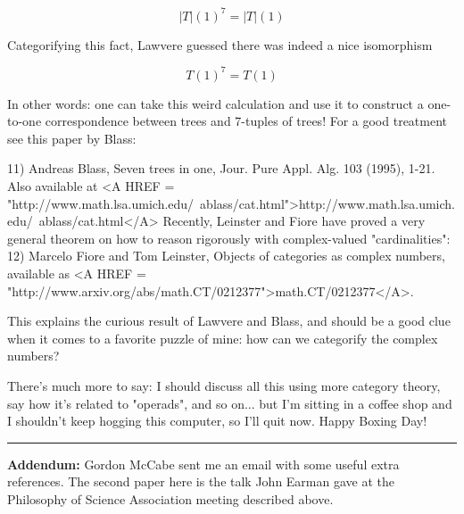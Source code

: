 $$

|T|(1)^{7} = |T|(1)
$$
    

Categorifying this fact, Lawvere guessed there was indeed a nice
isomorphism 


$$

T(1)^{7} = T(1)
$$
    

In other words: one can take this weird calculation and use it
to construct a one-to-one correspondence between trees and 
7-tuples of trees!  For a good treatment see this paper by Blass:

11) Andreas Blass, Seven trees in one, Jour. Pure Appl. Alg. 103 (1995), 
1-21.  Also available at <A HREF = "http://www.math.lsa.umich.edu/~ablass/cat.html">http://www.math.lsa.umich.edu/~ablass/cat.html</A>
Recently, Leinster and Fiore have proved a very general theorem 
on how to reason rigorously with complex-valued "cardinalities":
12) Marcelo Fiore and Tom Leinster, Objects of categories as
complex numbers, available as <A HREF = "http://www.arxiv.org/abs/math.CT/0212377">math.CT/0212377</A>.

This explains the curious result of Lawvere and Blass, and
should be a good clue when it comes to a favorite puzzle of
mine: how can we categorify the complex numbers?

There's much more to say: I should discuss all this using more 
category theory, say how it's related to "operads", and so on...
but I'm sitting in a coffee shop and I shouldn't keep hogging
this computer, so I'll quit now.   Happy Boxing Day!

\par\noindent\rule{\textwidth}{0.4pt}
\textbf{Addendum:} Gordon McCabe sent me an email with some useful
extra references.  The second paper here is the talk John Earman 
gave at the Philosophy of Science Association meeting described above.

